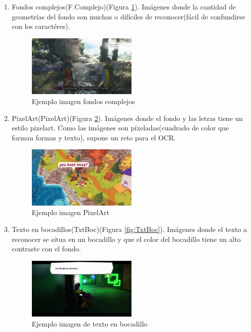 \begin{enumerate}
	\item Fondos complejos(F.Complejo)(Figura \ref{fig:Fcomplejo}). Imágenes donde la cantidad de geometrías del fondo son muchas o difíciles de reconocer(fácil de confundirse con los caractéres).
	\begin{figure}[H]
		\centering
		\includegraphics[width = 0.5\textwidth]{Imagenes/OCR/Complejo.png}
		\caption{Ejemplo imagen fondos complejos }
		\label{fig:Fcomplejo}
	\end{figure}
	\item PixelArt(PixelArt)(Figura \ref{fig:Pixelart}). Imágenes donde el fondo y las letras tiene un estilo pixelart. Como las imágenes son píxeladas(cuadrado de color que forman formas y texto), supone un reto para el OCR.
	\begin{figure}[H]
		\centering
		\includegraphics[width = 0.5\textwidth]{Imagenes/OCR/Pixel.png}
		\caption{Ejemplo imagen PixelArt }
		\label{fig:Pixelart}
	\end{figure}
	\item Texto en bocadillos(TxtBoc)(Figura \ref{fig:TxtBoc}). Imágenes donde el texto a reconocer se situa en un bocadillo y que el color del bocadillo tiene un alto contraste con el fondo.
	\begin{figure}[H]
		\centering
		\includegraphics[width = 0.5\textwidth]{Imagenes/OCR/Boc.png}
		\caption{Ejemplo imagen de texto en bocadillo }

\end{figure}
\end{enumerate}
